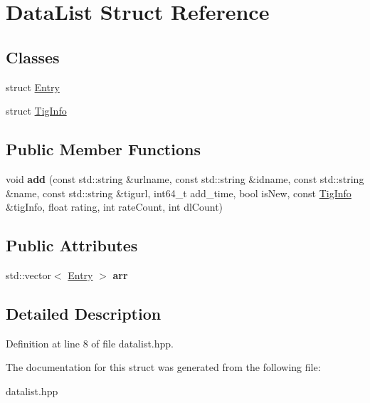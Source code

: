 \hypertarget{struct_data_list}{\section{Data\-List Struct Reference}
\label{struct_data_list}
}
\subsection*{Classes}
\begin{DoxyCompactItemize}
\item 
struct \hyperlink{struct_data_list_1_1_entry}{Entry}
\item 
struct \hyperlink{struct_data_list_1_1_tig_info}{Tig\-Info}
\end{DoxyCompactItemize}
\subsection*{Public Member Functions}
\begin{DoxyCompactItemize}
\item 
\hypertarget{struct_data_list_aae23d36c91eb9581bc8e3b9d574d3d15}{void {\bfseries add} (const std\-::string \&urlname, const std\-::string \&idname, const std\-::string \&name, const std\-::string \&tigurl, int64\-\_\-t add\-\_\-time, bool is\-New, const \hyperlink{struct_data_list_1_1_tig_info}{Tig\-Info} \&tig\-Info, float rating, int rate\-Count, int dl\-Count)}\label{struct_data_list_aae23d36c91eb9581bc8e3b9d574d3d15}

\end{DoxyCompactItemize}
\subsection*{Public Attributes}
\begin{DoxyCompactItemize}
\item 
\hypertarget{struct_data_list_aefb1fd0053150befa92ae61309812341}{std\-::vector$<$ \hyperlink{struct_data_list_1_1_entry}{Entry} $>$ {\bfseries arr}}\label{struct_data_list_aefb1fd0053150befa92ae61309812341}

\end{DoxyCompactItemize}


\subsection{Detailed Description}


Definition at line 8 of file datalist.\-hpp.



The documentation for this struct was generated from the following file\-:\begin{DoxyCompactItemize}
\item 
datalist.\-hpp\end{DoxyCompactItemize}
